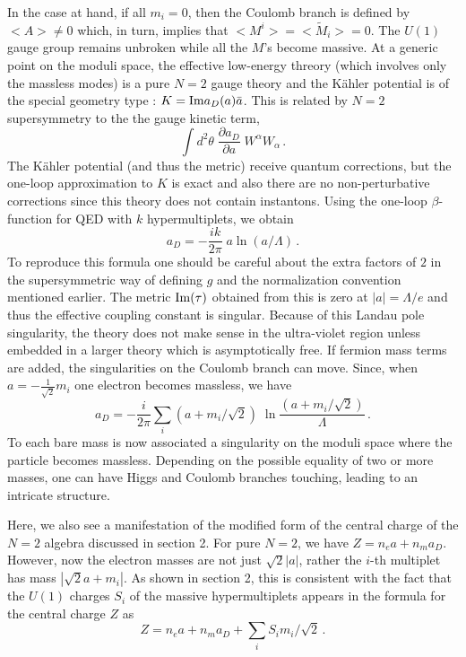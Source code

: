 In the case at hand, if all $m_i = 0$, then the Coulomb branch is
defined by $<A> \not= 0$ which, in turn, implies that
$<M^i>=<\widetilde M_i>=0$. The $U(1)$ gauge group remains unbroken
while all the $M$'s become massive. At a generic point on the moduli
space, the effective low-energy threory (which involves only the
massless modes) is a pure $N=2$ gauge theory and the K\"ahler
potential is of the special geometry type : $K={\rm Im} a_D (a)
\bar{a}$. This is related by $N=2$ supersymmetry to the the gauge
kinetic term,  
$$
\int d^2 \theta \; \frac{\partial a_D}{\partial a} \;
W^{\alpha}W_{\alpha}\,.
$$
The K\"ahler potential (and thus the metric) receive quantum
corrections, but the one-loop approximation to $K$ is exact and also
there are no non-perturbative corrections since this theory does not
contain instantons. Using the one-loop $\beta$-function for QED with
$k$ hypermultiplets, we obtain 
\begin{equation}
a_D = - \frac{ik}{2\pi} \; a \ln (a/\Lambda)\,.
\label{beta-hyper}
\end{equation}
To reproduce this formula one should be careful about the extra
factors of $2$ in the supersymmetric way of defining $g$ and the
normalization convention mentioned earlier. The metric ${\rm Im}
(\tau)$ obtained from this is zero at $|a| = \Lambda / e$ and thus the
effective coupling constant is singular. Because of this Landau pole
singularity, the theory does not make sense in the ultra-violet
region unless embedded in a larger theory which is asymptotically
free. If fermion mass terms are added, the singularities on the  
Coulomb branch can move.  Since, when $a = - \frac{1}{\sqrt{2}} m_i$
one electron becomes massless, we have
$$
a_D = - \frac{i}{2\pi} \sum_i (a+m_i / \sqrt{2}) \;\ln
\frac{(a+m_i / \sqrt{2})}{\Lambda}\,.
$$
To each bare mass is now associated a singularity on the moduli space
where the particle becomes massless.  Depending on the possible
equality of two or more masses, one can have Higgs and Coulomb
branches touching, leading to an intricate structure.

Here, we also see a manifestation of the modified form of the central
charge of the $N = 2$ algebra discussed in section 2. For pure $N=2$,
we have $Z = n_e a + n_m a_D$. However, now the electron masses are
not just $\sqrt{2} |a|$, rather the $i$-th multiplet has mass 
$|\sqrt{2} a + m_i |$. As shown in section 2, this is consistent with
the fact that the $U(1)$ charges $S_i$ of the massive hypermultiplets
appears in the formula for the central charge $Z$ as
$$
Z = n_e a + n_m a_D + \sum_i S_i m_i / \sqrt{2}\,.
$$

